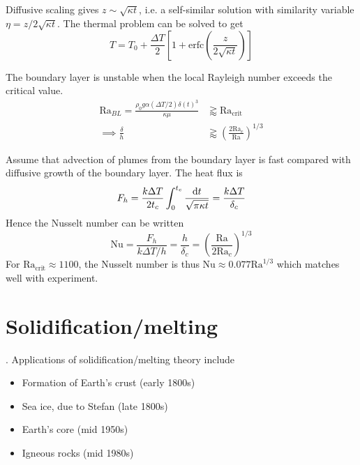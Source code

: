 \documentclass{jknotes}
\newcommand{\Ra}{\text{Ra}}
\begin{document}
Diffusive scaling gives $z \sim \sqrt{\kappa t}$, i.e. a self-similar solution
with similarity variable $\eta = z/2\sqrt{\kappa t}$. The thermal problem can
be solved to get
\begin{equation}
	T = T_0 + \frac{\Delta T}{2}\left[ 1 + \text{erfc}(\frac{z}{2\sqrt{\kappa
	t}})\right]
\end{equation}

The boundary layer is unstable when the local Rayleigh number exceeds the
critical value.
\begin{align}
	\Ra_{BL} = \frac{\rho_0 g \alpha (\Delta T/2) \delta(t)^3}{\kappa \mu}
	&\gtrapprox \Ra_{\text{crit}} \\
	\implies \frac{\delta}{h} &\gtrapprox \left( \frac{2
	\Ra_c}{\Ra}\right)^{1/3}
\end{align}

Assume that advection of plumes from the boundary layer is fast compared with
diffusive growth of the boundary layer. The heat flux is
\begin{equation}
	F_h = \frac{k \Delta T}{2t_c} \int_0^{t_c} \frac{\diffd t}{\sqrt{\pi\kappa
	t}} = \frac{k\Delta T}{\delta_c}
\end{equation}
Hence the Nusselt number can be written
\begin{equation}
	\text{Nu} = \frac{F_h}{k\Delta T/h} = \frac{h}{\delta_c} = \left(
	\frac{\Ra}{2\Ra_c}\right)^{1/3}
\end{equation}
For $\Ra_{\text{crit}} \approx 1100$, the Nusselt number is thus $\text{Nu}
\approx 0.077 \Ra^{1/3}$ which matches well with experiment.

\section{Solidification/melting}.
Applications of solidification/melting theory include
\begin{itemize}
	\item Formation of Earth's crust (early 1800s)
	\item Sea ice, due to Stefan (late 1800s)
	\item Earth's core (mid 1950s)
	\item Igneous rocks (mid 1980s)
\end{itemize}
\end{document}
